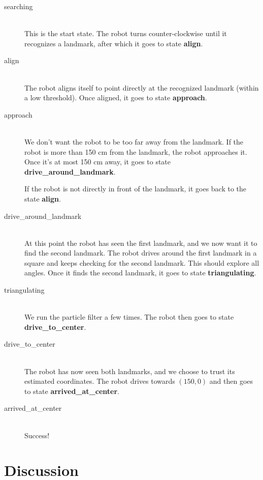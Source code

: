 \documentclass[a4paper,12pt]{article}
\begin{document}
\begin{description}
\item[searching]\hfill\\
This is the start state.  The robot turns counter-clockwise until it recognizes
a landmark, after which it goes to state \textbf{align}.

\item[align]\hfill\\
The robot aligns itself to point directly at the recognized landmark (within
a low threshold).  Once aligned, it goes to state \textbf{approach}.

\item[approach]\hfill\\
We don't want the robot to be too far away from the landmark.  If the robot is
more than 150 cm from the landmark, the robot approaches it.  Once it's at most
150 cm away, it goes to state \textbf{drive_around_landmark}.

If the robot is not directly in front of the landmark, it goes back to the state
\textbf{align}.

\item[drive_around_landmark]\hfill\\
At this point the robot has seen the first landmark, and we now want it to find
the second landmark.  The robot drives around the first landmark in a square and
keeps checking for the second landmark.  This should explore all angles.  Once
it finds the second landmark, it goes to state \textbf{triangulating}.

\item[triangulating]\hfill\\
We run the particle filter a few times.  The robot then goes to state
\textbf{drive_to_center}.

\item[drive_to_center]\hfill\\
The robot has now seen both landmarks, and we choose to trust its estimated
coordinates.  The robot drives towards $(150, 0)$ and then goes to state
\textbf{arrived_at_center}.

\item[arrived_at_center]\hfill\\
Success!
\end{description}


\section{Discussion}
\end{document}
